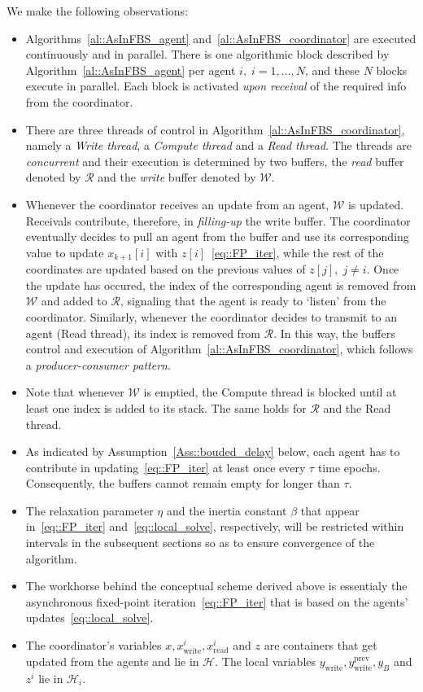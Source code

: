 \documentclass[envcountsect]{svjour3}
\begin{document}
We make the following observations:
\begin{itemize}
\item Algorithms~\ref{al::AsInFBS_agent} and~\ref{al::AsInFBS_coordinator} are executed continuously and in parallel. There is one algorithmic block described by Algorithm~\ref{al::AsInFBS_agent} per agent $i,\;i=1,\ldots,N$, and these $N$ blocks execute in parallel. Each block is activated \emph{upon receival} of the required info from the coordinator.
\item There are three threads of control in Algorithm~\ref{al::AsInFBS_coordinator}, namely a \emph{Write thread}, a \emph{Compute thread} and a \emph{Read thread}. The threads are \emph{concurrent} and their execution is determined by two buffers, the \emph{read} buffer denoted by $\mathcal{R}$ and the \emph{write} buffer denoted by $\mathcal{W}$.
\item Whenever the coordinator receives an update from an agent, $\mathcal{W}$ is updated. Receivals contribute, therefore, in \emph{filling-up} the write buffer. The coordinator eventually decides to pull an agent from the buffer and use its corresponding value to update $x_{k+1}[i]$ with $z[i]$~\ref{eq::FP_iter}, while the rest of the coordinates are updated based on the previous values of $z[j],\;j\neq i$. Once the update has occured, the index of the corresponding agent is removed from $\mathcal{W}$ and added to $\mathcal{R}$, signaling that the agent is ready to `listen' from the coordinator. Similarly, whenever the coordinator decides to transmit to an agent (Read thread), its index is removed from $\mathcal{R}$. In this way, the buffers control and execution of Algorithm~\ref{al::AsInFBS_coordinator}, which follows a \emph{producer-consumer pattern}.
\item Note that whenever $\mathcal{W}$ is emptied, the Compute thread is blocked until at least one index is added to its stack. The same holds for $\mathcal{R}$ and the Read thread.
\item As indicated by Assumption~\ref{Ass::bouded_delay} below, each agent has to contribute in updating~\eqref{eq::FP_iter} at least once every $\tau$ time epochs. Consequently, the buffers cannot remain empty for longer than $\tau$.
\item The relaxation parameter $\eta$ and the inertia constant $\beta$ that appear in~\eqref{eq::FP_iter} and~\eqref{eq::local_solve}, respectively, will be restricted within intervals in the subsequent sections so as to ensure convergence of the algorithm.
\item The workhorse behind the conceptual scheme derived above is essentialy the asynchronous fixed-point iteration~\eqref{eq::FP_iter} that is based on the agents' updates~\eqref{eq::local_solve}.
\item The coordinator's variables $x,x^i_\mathrm{write},x^i_\mathrm{read}$ and $z$ are containers that get updated from the agents and lie in $\mathcal{H}$. The local variables $y_\mathrm{write}, y_\mathrm{write}^\mathrm{prev}, y_B$ and $z^i$ lie in $\mathcal{H}_i$.
\end{itemize}
\end{document}
